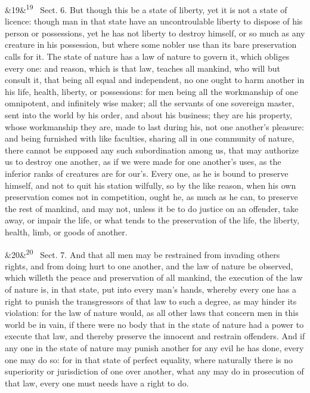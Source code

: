 \documentclass[12pt]{article}
\newcommand{\para}[1][]{\par\noindent\ifx&#1&\else\textsuperscript{\footnotesize #1}~\fi}
\begin{document}
\para[19] Sect. 6. But though this be a state of liberty, yet it is not a state of licence: though man in that state have an uncontroulable liberty to dispose of his person or possessions, yet he has not liberty to destroy himself, or so much as any creature in his possession, but where some nobler use than its bare preservation calls for it. The state of nature has a law of nature to govern it, which obliges every one: and reason, which is that law, teaches all mankind, who will but consult it, that being all equal and independent, no one ought to harm another in his life, health, liberty, or possessions: for men being all the workmanship of one omnipotent, and infinitely wise maker; all the servants of one sovereign master, sent into the world by his order, and about his business; they are his property, whose workmanship they are, made to last during his, not one another's pleasure: and being furnished with like faculties, sharing all in one community of nature, there cannot be supposed any such subordination among us, that may authorize us to destroy one another, as if we were made for one another's uses, as the inferior ranks of creatures are for our's. Every one, as he is bound to preserve himself, and not to quit his station wilfully, so by the like reason, when his own preservation comes not in competition, ought he, as much as he can, to preserve the rest of mankind, and may not, unless it be to do justice on an offender, take away, or impair the life, or what tends to the preservation of the life, the liberty, health, limb, or goods of another.

\para[20] Sect. 7. And that all men may be restrained from invading others rights, and from doing hurt to one another, and the law of nature be observed, which willeth the peace and preservation of all mankind, the execution of the law of nature is, in that state, put into every man's hands, whereby every one has a right to punish the transgressors of that law to such a degree, as may hinder its violation: for the law of nature would, as all other laws that concern men in this world be in vain, if there were no body that in the state of nature had a power to execute that law, and thereby preserve the innocent and restrain offenders. And if any one in the state of nature may punish another for any evil he has done, every one may do so: for in that state of perfect equality, where naturally there is no superiority or jurisdiction of one over another, what any may do in prosecution of that law, every one must needs have a right to do.
\end{document}
